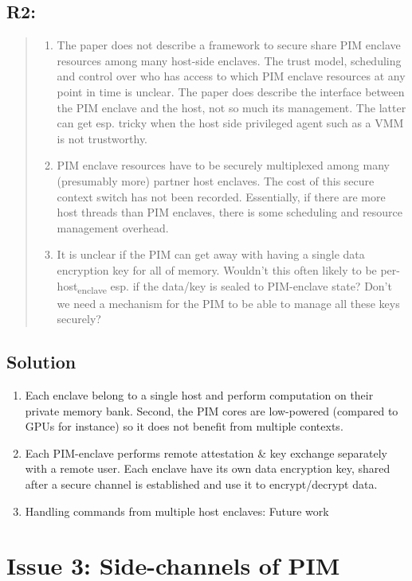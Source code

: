 \documentclass[11pt]{article}
\begin{document}
\subsection{R2:}
\label{sec:org2b7cd43}
\begin{quote}
\begin{enumerate}
\item The paper does not describe a framework to secure share PIM enclave resources among many host-side enclaves. The trust model, scheduling and control over who has access to which PIM enclave resources at any point in time is unclear. The paper does describe the interface between the PIM enclave and the host, not so much its management. The latter can get esp. tricky when the host side privileged agent such as a VMM is not trustworthy.
\item PIM enclave resources have to be securely multiplexed among many (presumably more) partner host enclaves. The cost of this secure context switch has not been recorded. Essentially, if there are more host threads than PIM enclaves, there is some scheduling and resource management overhead.
\item It is unclear if the PIM can get away with having a single data encryption key for all of memory. Wouldn't this often likely to be per-host\textsubscript{enclave} esp. if the data/key is sealed to PIM-enclave state? Don't we need a mechanism for the PIM to be able to manage all these keys securely?
\end{enumerate}
\end{quote}
\subsection{Solution}
\label{sec:orgca159f9}
\begin{enumerate}
\item Each enclave belong to a single host and perform computation on their private memory bank. Second, the PIM cores are low-powered (compared to GPUs for instance) so it does not benefit from multiple contexts.
\item Each PIM-enclave performs remote attestation \& key exchange separately with a remote user. Each enclave have its own data encryption key, shared after a secure channel is established and use it to encrypt/decrypt data.
\item Handling commands from multiple host enclaves: Future work
\end{enumerate}
\section{Issue 3: Side-channels of PIM}
\label{sec:org062616e}
\end{document}
